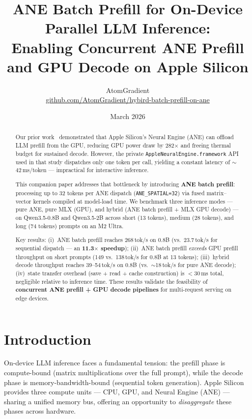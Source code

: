 \documentclass[11pt]{article}
\title{\textbf{ANE Batch Prefill for On-Device Parallel LLM Inference:\\
       Enabling Concurrent ANE Prefill and GPU Decode on Apple Silicon}}
\author{%
  AtomGradient\\
  \small\href{https://github.com/AtomGradient/hybird-batch-prefill-on-ane}{github.com/AtomGradient/hybird-batch-prefill-on-ane}
}
\date{March 2026}
\begin{document}
\maketitle

\begin{abstract}
Our prior work~\cite{atomgradient2026hybrid} demonstrated that Apple
Silicon's Neural Engine (ANE) can offload LLM prefill from the GPU, reducing
GPU power draw by 282$\times$ and freeing thermal budget for sustained decode.
However, the private \texttt{AppleNeuralEngine.framework} API used in that
study dispatches only one token per call, yielding a constant latency of
$\sim$42\,ms/token --- impractical for interactive inference.

This companion paper addresses that bottleneck by introducing \textbf{ANE
batch prefill}: processing up to 32 tokens per ANE dispatch
(\texttt{ANE\_SPATIAL=32}) via fused matrix--vector kernels compiled at
model-load time. We benchmark three inference modes --- pure ANE, pure MLX
(GPU), and hybrid (ANE batch prefill + MLX GPU decode) --- on Qwen3.5-0.8B
and Qwen3.5-2B across short (13 tokens), medium (28 tokens), and long (74
tokens) prompts on an M2 Ultra.

Key results:
(i)~ANE batch prefill reaches 268\,tok/s on 0.8B (vs.\ 23.7\,tok/s for
sequential dispatch --- an \textbf{11.3$\times$ speedup});
(ii)~ANE batch prefill \emph{exceeds} GPU prefill throughput on short
prompts (149 vs.\ 138\,tok/s for 0.8B at 13 tokens);
(iii)~hybrid decode throughput reaches 39--54\,tok/s on 0.8B (vs.\
$\sim$18\,tok/s for pure ANE decode);
(iv)~state transfer overhead (save + read + cache construction) is
$<$30\,ms total, negligible relative to inference time.
These results validate the feasibility of \textbf{concurrent ANE prefill +
GPU decode pipelines} for multi-request serving on edge devices.
\end{abstract}

\section{Introduction}
\label{sec:intro}

On-device LLM inference faces a fundamental tension: the prefill phase is
compute-bound (matrix multiplications over the full prompt), while the
decode phase is memory-bandwidth-bound (sequential token generation).
Apple Silicon provides three compute units --- CPU, GPU, and Neural Engine
(ANE) --- sharing a unified memory bus, offering an opportunity to
\emph{disaggregate} these phases across hardware.
\end{document}

